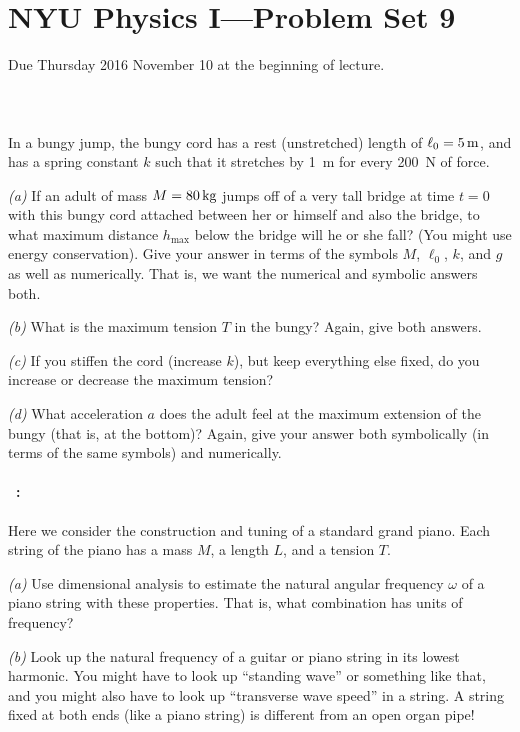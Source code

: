 \documentclass[12pt]{article}
\begin{document}
\section*{NYU Physics I---Problem Set 9}

Due Thursday 2016 November 10 at the beginning of lecture.

\paragraph{\problemname~\theproblem}%
In a bungy jump, the bungy cord has a rest (unstretched) length of
$\ell_0 = 5\,\mathrm{m}$, and has a spring constant $k$ such that it stretches
by 1~m for every 200~N of force.

\textsl{(a)} If an adult of mass $M=80\,\mathrm{kg}$ jumps off of a very tall
bridge at time $t=0$ with this bungy cord attached between her or
himself and also the bridge, to what maximum distance $h_\mathrm{max}$
below the bridge will he or she fall?  (You might use energy
conservation). Give your answer in terms of the symbols $M$, $\ell_0$,
$k$, and $g$ as well as numerically. That is, we want the numerical
and symbolic answers both.

\textsl{(b)} What is the maximum tension $T$ in the bungy? Again, give
both answers.

\textsl{(c)} If you stiffen the cord (increase $k$), but keep
everything else fixed, do you increase or decrease the maximum
tension?

\textsl{(d)} What acceleration $a$ does the adult feel at the maximum
extension of the bungy (that is, at the bottom)? Again, give your
answer both symbolically (in terms of the same symbols) and numerically.

\paragraph{\problemname~\theproblem:}%
Here we consider the construction and tuning of a standard grand piano.
Each string of the piano has a mass $M$, a length $L$, and a tension $T$.

\textsl{(a)} Use dimensional analysis to estimate the natural angular
frequency $\omega$ of a piano string with these properties. That is,
what combination has units of frequency?

\textsl{(b)} Look up the natural frequency of a guitar or piano string
in its lowest harmonic. You might have to look up ``standing wave'' or
something like that, and you might also have to look up ``transverse
wave speed'' in a string. A string fixed at both ends (like a piano
string) is different from an open organ pipe!
\end{document}
